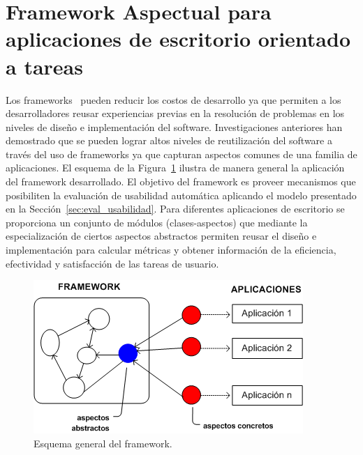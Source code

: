 \section{Framework Aspectual para aplicaciones de escritorio orientado a tareas}
\label{sec:framework_aspectual}

Los frameworks~\cite{JOHNSON1997} pueden reducir los costos de desarrollo ya que permiten a los desarrolladores reusar experiencias previas en la resolución de problemas en los niveles de diseño e implementación del software. Investigaciones anteriores han demostrado que se pueden lograr altos niveles de reutilización del software a través del uso de frameworks ya que capturan aspectos comunes de una familia de aplicaciones. 
El esquema de la Figura~\ref{fig:fig2} ilustra de manera general la aplicación del framework desarrollado. El objetivo del framework es proveer mecanismos que posibiliten la evaluación de usabilidad automática aplicando el modelo presentado en la Sección~\ref{sec:eval_usabilidad}. Para diferentes aplicaciones de escritorio se proporciona un conjunto de módulos (clases-aspectos) que mediante la especialización de ciertos aspectos abstractos permiten reusar el diseño e implementación para calcular métricas y obtener información de la eficiencia, efectividad y satisfacción de las tareas de usuario.
\begin{figure}[ht!]
	\centering
	\includegraphics[scale=0.70]{figs/fig2.png}
	\caption{\label{fig:fig2} Esquema general del framework.}
\end{figure}


